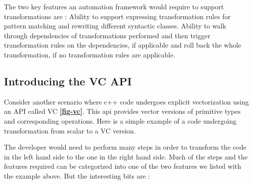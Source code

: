 \documentclass[preprint]{sigplanconf}
\begin{document}
The two key features an automation framework would require to support transformations are :
Ability to support expressing transformation rules for pattern matching and rewriting different syntactic classes. 
Ability to walk through dependencies of transformations performed and then trigger transformation rules on the dependencies, if applicable and roll back the whole transformation, if no transformation rules are applicable.

\subsection{Introducing the VC API}
Consider another scenario where c++ code undergoes explicit vectorization using an API called VC \textbf{\ref{fig-vc}}. This api provides vector versions of primitive types and corresponding operations. Here is a simple example of a code undergoing transformation from scalar to a VC version.
\begin{figure*}

\caption{Introducing VC}
\label{fig-vc}
\end{figure*}
The developer would need to perform many steps in order to transform the code in the left hand side to the one in the right hand side. Much of the steps and the features required can be categorized into one of the two features we listed with the example above. But the interesting bits are :
\end{document}

